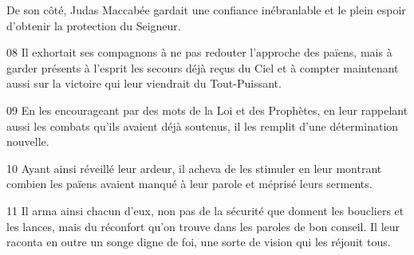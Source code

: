 De son côté, Judas Maccabée gardait une confiance inébranlable et le plein espoir d’obtenir la protection du Seigneur.

08 Il exhortait ses compagnons à ne pas redouter l’approche des païens, mais à garder présents à l’esprit les secours déjà reçus du Ciel et à compter maintenant aussi sur la victoire qui leur viendrait du Tout-Puissant.

09 En les encourageant par des mots de la Loi et des Prophètes, en leur rappelant aussi les combats qu’ils avaient déjà soutenus, il les remplit d’une détermination nouvelle.

10 Ayant ainsi réveillé leur ardeur, il acheva de les stimuler en leur montrant combien les païens avaient manqué à leur parole et méprisé leurs serments.

11 Il arma ainsi chacun d’eux, non pas de la sécurité que donnent les boucliers et les lances, mais du réconfort qu’on trouve dans les paroles de bon conseil. Il leur raconta en outre un songe digne de foi, une sorte de vision qui les réjouit tous.
